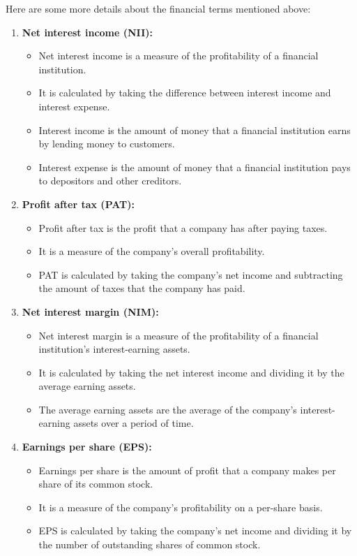 Here are some more details about the financial terms mentioned above:
\begin{enumerate}
\item \textbf{Net interest income (NII):}

\begin{itemize}
        \item  Net interest income is a measure of the profitability of a financial institution.
        \item  It is calculated by taking the difference between interest income and interest expense.
        \item  Interest income is the amount of money that a financial institution earns by lending money to customers.
        \item  Interest expense is the amount of money that a financial institution pays to depositors and other creditors.
\end{itemize}
    \item  \textbf{Profit after tax (PAT):}
    \begin{itemize}
        \item  Profit after tax is the profit that a company has after paying taxes.
        \item  It is a measure of the company's overall profitability.
        \item  PAT is calculated by taking the company's net income and subtracting the amount of taxes that the company has paid.
    \end{itemize}
    
    \item  \textbf{Net interest margin (NIM):}
    \begin{itemize}

        \item  Net interest margin is a measure of the profitability of a financial institution's interest-earning assets.
        \item  It is calculated by taking the net interest income and dividing it by the average earning assets.
        \item  The average earning assets are the average of the company's interest-earning assets over a period of time.
    \end{itemize}
    \item  \textbf{Earnings per share (EPS):}
    \begin{itemize}

        \item  Earnings per share is the amount of profit that a company makes per share of its common stock.
        \item  It is a measure of the company's profitability on a per-share basis.
        \item  EPS is calculated by taking the company's net income and dividing it by the number of outstanding shares of common stock.
    \end{itemize}
    

\end{enumerate}

